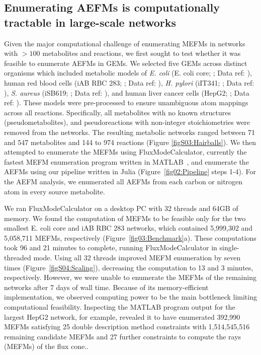 \documentclass[12pt]{article}
\begin{document}
\subsection*{Enumerating AEFMs is computationally tractable in large-scale networks}

Given the major computational challenge of enumerating MEFMs in
networks with $>100$ metabolites and reactions, we first sought to test
whether it was feasible to enumerate AEFMs in GEMs. We selected five GEMs
across distinct organisms which included metabolic models of \textit{E.
coli} (E. coli core; \citealt{OrthJeffreyD2010RaUo}; Data ref:
\citealt{OrthJeffreyD2010RaUoDATASET}), human red blood cells (iAB RBC
283; \citealt{BordbarAarash2011iApd}; Data ref:
\citealt{BordbarAarash2011iApdDATASET}), \textit{H. pylori} (iIT341;
\citealt{ThieleInes2005EMRo}; Data ref:
\citealt{ThieleInes2005EMRoDATASET}), \textit{S. aureus} (iSB619;
\citealt{BeckerScottA2005Grot}; Data ref:
\citealt{BeckerScottA2005GrotDATASET}), and human liver cancer cells
(HepG2; \citealt{NilssonAvlant2020Qaoa}; Data ref:
\citealt{NilssonAvlant2020QaoaDATASET}). These models were pre-processed
to ensure unambiguous atom mappings across all reactions. Specifically,
all metabolites with no known structures (pseudometabolites), and
pseudoreactions with non-integer stoichiometries were removed from the
networks. The resulting metabolic networks ranged between 71 and 547
metabolites and 144 to 974 reactions (Figure \ref{figS03:Hairballs}). We
then attempted to enumerate the MEFMs using FluxModeCalculator, currently
the fastest MEFM enumeration program written in
MATLAB~\citep{vanKlinkenJanBert2016Faet}, and enumerate the AEFMs using
our pipeline written in Julia (Figure~\ref{fig02:Pipeline} steps 1-4). For
the AEFM analysis, we enumerated all AEFMs from each carbon or nitrogen
atom in every source metabolite. 

We ran FluxModeCalculator on a desktop PC with 32 threads and 64GB of
memory. We found the computation of MEFMs to be feasible only for the two
smallest E. coli core and iAB RBC 283 networks, which contained 5,999,302
and 5,058,711 MEFMs, respectively (Figure~\ref{fig03:Benchmark}a). These
computations took 96 and 21 minutes to complete, running
FluxModeCalculator in single-threaded mode. Using all 32 threads improved MEFM
enumeration by seven times (Figure~\ref{figS04:Scaling}), decreasing the
computation to 13 and 3 minutes, respectively. However, we were unable to
enumerate the MEFMs of the remaining networks after 7 days of wall time.
Because of its memory-efficient implementation, we observed computing
power to be the main bottleneck limiting computational feasibility.
Inspecting the MATLAB program output for the largest HepG2 network, for
example, revealed it to have enumerated 392,990 MEFMs satisfying 25 double
description method constraints with 1,514,545,516 remaining candidate
MEFMs and 27 further constraints to compute the rays (MEFMs) of the flux
cone..
\end{document}
